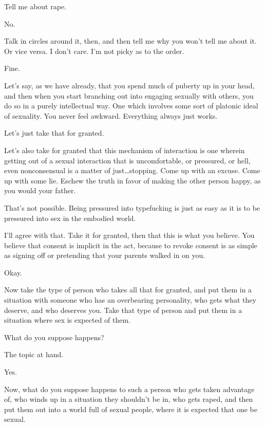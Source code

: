 \begin{ally}
Tell me about rape.
\end{ally}
No.

\begin{ally}
Talk in circles around it, then, and then tell me why you won't tell me about it. Or vice versa. I don't care. I'm not picky as to the order.
\end{ally}
Fine.
\newpage

Let's say, as we have already, that you spend much of puberty up in your head, and then when you start branching out into engaging sexually with others, you do so in a purely intellectual way. One which involves some sort of platonic ideal of sexuality. You never feel awkward. Everything always just works.

Let's just take that for granted.

Let's also take for granted that this mechanism of interaction is one wherein getting out of a sexual interaction that is uncomfortable, or pressured, or hell, even nonconsensual is a matter of just\ldots{}stopping. Come up with an excuse. Come up with some lie. Eschew the truth in favor of making the other person happy, as you would your father.

\begin{ally}
That's not possible. Being pressured into typefucking is just as easy as it is to be pressured into sex in the embodied world.
\end{ally}
I'll agree with that. Take it for granted, then that this is what you believe. You believe that consent is implicit in the act, because to revoke consent is as simple as signing off or pretending that your parents walked in on you.

\begin{ally}
Okay.
\end{ally}
Now take the type of person who takes all that for granted, and put them in a situation with someone who has an overbearing personality, who gets what they deserve, and who deserves you. Take that type of person and put them in a situation where sex is expected of them.

What do you suppose happens?

\begin{ally}
The topic at hand.
\end{ally}
Yes.

Now, what do you suppose happens to such a person who gets taken advantage of, who winds up in a situation they shouldn't be in, who gets raped, and then put them out into a world full of sexual people, where it is expected that one be sexual.
\newpage

